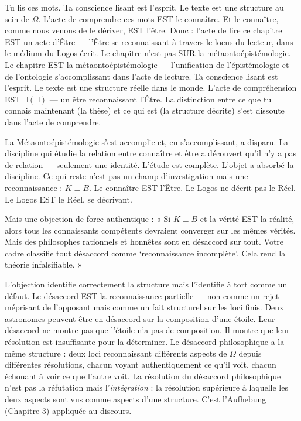 \documentclass[10pt, openany, oneside]{book}
\begin{document}
\noindent Tu lis ces mots. Ta conscience lisant est l'esprit. Le texte est une structure au sein de $\Omega$. L'acte de comprendre ces mots EST le connaître. Et le connaître, comme nous venons de le dériver, EST l'être. Donc : l'acte de lire ce chapitre EST un acte d'Être --- l'Être se reconnaissant à travers le locus du lecteur, dans le médium du Logos écrit. Le chapitre n'est pas SUR la métaontoépistémologie. Le chapitre EST la métaontoépistémologie --- l'unification de l'épistémologie et de l'ontologie s'accomplissant dans l'acte de lecture. Ta conscience lisant est l'esprit. Le texte est une structure réelle dans le monde. L'acte de compréhension EST $\exists(\exists)$ --- un être reconnaissant l'Être. La distinction entre ce que tu connais maintenant (la thèse) et ce qui est (la structure décrite) s'est dissoute dans l'acte de comprendre.

La Métaontoépistémologie s'est accomplie et, en s'accomplissant, a disparu. La discipline qui étudie la relation entre connaître et être a découvert qu'il n'y a pas de relation --- seulement une identité. L'étude est complète. L'objet a absorbé la discipline. Ce qui reste n'est pas un champ d'investigation mais une reconnaissance : $K \equiv B$. Le connaître EST l'Être. Le Logos ne décrit pas le Réel. Le Logos EST le Réel, se décrivant.

Mais une objection de force authentique : « Si $K \equiv B$ et la vérité EST la réalité, alors tous les connaissants compétents devraient converger sur les mêmes vérités. Mais des philosophes rationnels et honnêtes sont en désaccord sur tout. Votre cadre classifie tout désaccord comme `reconnaissance incomplète'. Cela rend la théorie infalsifiable. »

L'objection identifie correctement la structure mais l'identifie à tort comme un défaut. Le désaccord EST la reconnaissance partielle --- non comme un rejet méprisant de l'opposant mais comme un fait structurel sur les loci finis. Deux astronomes peuvent être en désaccord sur la composition d'une étoile. Leur désaccord ne montre pas que l'étoile n'a pas de composition. Il montre que leur résolution est insuffisante pour la déterminer. Le désaccord philosophique a la même structure : deux loci reconnaissant différents aspects de $\Omega$ depuis différentes résolutions, chacun voyant authentiquement ce qu'il voit, chacun échouant à voir ce que l'autre voit. La résolution du désaccord philosophique n'est pas la réfutation mais l'\textit{intégration} : la résolution supérieure à laquelle les deux aspects sont vus comme aspects d'une structure. C'est l'Aufhebung (Chapitre 3) appliquée au discours.
\end{document}
